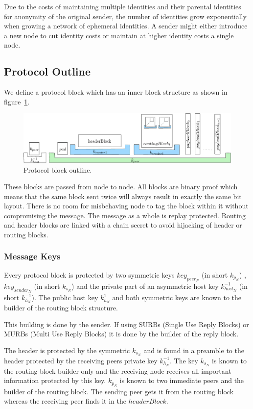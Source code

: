 \documentclass[9pt,journal,compsoc]{IEEEtran}
\begin{document}
Due to the costs of maintaining multiple identities and their parental identities for anonymity of the original sender, the number of identities grow exponentially when growing a network of ephemeral identities. A sender might either introduce a new node to cut identity costs or maintain at higher identity costs a single node.

\subsection{Protocol Outline}
We define a protocol block which has an inner block structure as shown in figure~\ref{fig:blocks}.

\begin{figure}[!t]
	\centering
	\includegraphics[width=\columnwidth]{../inc/blockLayoutSimplified}
	\caption{Protocol block outline.}
	\label{fig:blocks}
\end{figure}

These blocks are passed from node to node. All blocks are binary proof which means that the same block sent twice will always result in exactly the same bit layout. There is no room for misbehaving node to tag the block within it without compromising the message. The message as a whole is replay protected. Routing and header blocks are linked with a chain secret to avoid hijacking of header or routing blocks.

\subsubsection{Message Keys}
Every protocol block is protected by two symmetric keys $key_{peer_N}$ (in short $k_{p_N}$) , $key_{sender_N}$ (in short $k_{s_N}$) and the private part of an asymmetric host key $k^{-1}_{host_N}$ (in short $k^{-1}_{h_N}$). The public host key $k^{1}_{h_N}$ and both symmetric keys are known to the builder of the routing block structure. 

This building is done by the sender. If using SURBs (Single Use Reply Blocks) or MURBs (Multi Use Reply Blocks) it is done by the builder of the reply block. 

The header is protected by the symmetric $k_{s_N}$ and is found in a preamble to the header protected by the receiving peers private key $k^{-1}_{h_N}$. The key $k_{s_N}$ is known to the routing block builder only and the receiving node receives all important information protected by this key. $k_{p_N}$ is known to two immediate peers and the builder of the routing block. The sending peer gets it from the routing block whereas the receiving peer finds it in the $headerBlock$. 
\end{document}
